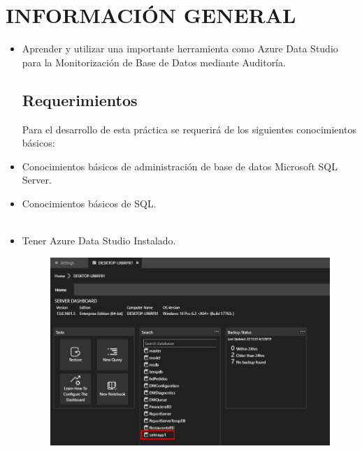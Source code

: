 \section{INFORMACIÓN GENERAL} 

\begin{itemize}
\subsection{Objetivos:}

	 \item Aprender y utilizar una importante herramienta como Azure Data Studio para la Monitorización de Base de Datos mediante Auditoría.
\subsection{Requerimientos}


	
    Para el desarrollo de esta práctica se requerirá de los siguientes        	  conocimientos básicos:
	\item Conocimientos básicos de administración de base de datos 	  			 Microsoft SQL Server.
	\item Conocimientos básicos de SQL.\\\\
	
	\item Tener Azure Data Studio Instalado.\\
	
	\begin{figure}[htb]
	\begin{center}
	\includegraphics[width=15cm]{./Imagenes/audit0}
	\end{center}
	\end{figure}


\end{itemize}